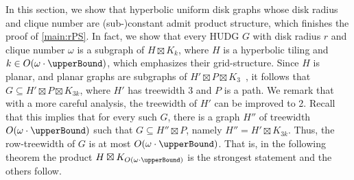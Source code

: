 \documentclass[a4paper,english,cleveref,thm-restate]{lipics-v2021}
\newcommand{\thomas}[1]{\todo[linecolor=blue!25,backgroundcolor=blue!25]{\footnotesize#1}}
\DeclareMathOperator{\tw}{tw}
\begin{document}


In this section, we show that hyperbolic uniform disk graphs whose disk radius and clique number are (sub-)constant admit product structure, which finishes the proof of \cref{main:rPS}.
In fact, we show that every HUDG $ G $ with disk radius $ r $ and clique number $ \omega $ is a subgraph of $ H \boxtimes K_k $, where $ H $ is a hyperbolic tiling and $ k \in O(\omega \cdot \upperBound) $, which emphasizes their grid-structure.
Since $ H $ is planar, and planar graphs are subgraphs of $ H' \boxtimes P \boxtimes K_3 $~\cite{dujmovic_planar_2019}, it follows that $ G \subseteq H' \boxtimes P \boxtimes K_{3k} $, where $ H' $ has treewidth $ 3 $ and $ P $ is a path.
We remark that with a more careful analysis, the treewidth of $ H' $ can be improved to 2.
%
Recall that this implies that for every such $ G $, there is a graph $ H'' $ of treewidth $ O(\omega \cdot \upperBound) $ such that $ G \subseteq H'' \boxtimes P $, namely $ H'' = H' \boxtimes K_{3k} $.
Thus, the row-treewidth of $ G $ is at most $ O(\omega \cdot \upperBound) $.
That is, in the following theorem the product $ H \boxtimes K_{O(\omega \cdot \upperBound)} $ is the strongest statement and the others follow.
\end{document}
